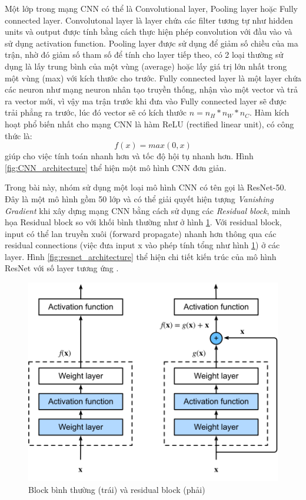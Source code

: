\documentclass[conference]{IEEEtran}
\begin{document}
Một lớp trong mạng CNN có thể là Convolutional layer, Pooling layer hoặc Fully connected layer. Convolutonal layer là layer chứa các filter tương tự như hidden units và output được tính bằng cách thực hiện phép convolution với đầu vào và sử dụng activation function. Pooling layer được sử dụng để giảm số chiều của ma trận, nhờ đó giảm số tham số để tính cho layer tiếp theo, có 2 loại thường sử dụng là lấy trung bình của một vùng (average) hoặc lấy giá trị lớn nhất trong một vùng (max) với kích thước cho trước. Fully connected layer là một layer chứa các neuron như mạng neuron nhân tạo truyền thống, nhận vào một vector và trả ra vector mới, vì vậy ma trận trước khi đưa vào Fully connected layer sẽ được trải phẳng ra trước, lúc đó vector sẽ có kích thước $n=n_{H}*n_{W}*n_{C}$. Hàm kích hoạt phổ biến nhất cho mạng CNN là hàm ReLU (rectified linear unit), có công thức là:
$$f(x)=max(0,x)$$
giúp cho việc tính toán nhanh hơn và tốc độ hội tụ nhanh hơn. Hình \ref{fig:CNN_architecture} thể hiện một mô hình CNN đơn giản.

Trong bài này, nhóm sử dụng một loại mô hình CNN có tên gọi là ResNet-50\cite{he2015deep}. Đây là một mô hình gồm 50 lớp và có thể giải quyết hiện tượng \textit{Vanishing Gradient} khi xây dựng mạng CNN bằng cách sử dụng các \textit{Residual block}, minh họa Residual block so với khối bình thường như ở hình \ref{fig:residual_block}. Với residual block, input có thể lan truyền xuôi (forward propagate) nhanh hơn thông qua các residual connections (việc đưa input x vào phép tính tổng như hình \ref{fig:residual_block}) ở các layer. Hình \ref{fig:resnet_architecture} thể hiện chi tiết kiến trúc của mô hình ResNet với số layer tương ứng \cite{he2015deep}.

\begin{figure}[h]
\includegraphics[width=0.9\columnwidth]{assets/residual-block.png}
  \caption{Block bình thường (trái) và residual block (phải) }
  \label{fig:residual_block}
\end{figure}
\end{document}
